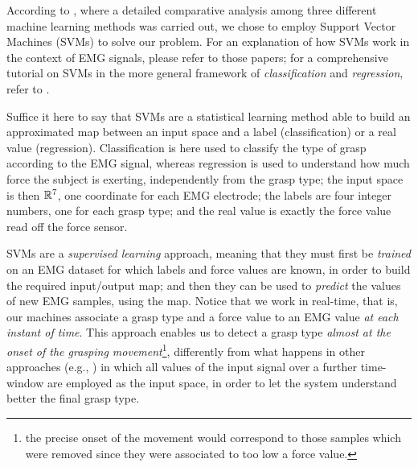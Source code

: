 According to \cite{2008.ICRA,2008.BioCyb}, where a detailed
comparative analysis among three different machine learning methods
was carried out, we chose to employ Support Vector Machines (SVMs) to
solve our problem. For an explanation of how SVMs work in the context
of EMG signals, please refer to those papers; for a comprehensive
tutorial on SVMs in the more general framework of
\emph{classification} and \emph{regression}, refer to
\cite{Burges98,SmolaTut2004}.

Suffice it here to say that SVMs are a statistical learning method
able to build an approximated map between an input space and a label
(classification) or a real value (regression). Classification is here
used to classify the type of grasp according to the EMG signal,
whereas regression is used to understand how much force the subject is
exerting, independently from the grasp type; the input space is then
$\mathbb{R}^7$, one coordinate for each EMG electrode; the labels are four
integer numbers, one for each grasp type; and the real value is
exactly the force value read off the force sensor.

SVMs are a \emph{supervised learning} approach, meaning that they must
first be \emph{trained} on an EMG dataset for which labels and force
values are known, in order to build the required input/output map; and
then they can be used to \emph{predict} the values of new EMG samples,
using the map. Notice that we work in real-time, that is, our machines
associate a grasp type and a force value to an EMG value \emph{at each
instant of time}. This approach enables us to detect a grasp type
\emph{almost at the onset of the grasping movement}\footnote{the
precise onset of the movement would correspond to those samples which
were removed since they were associated to too low a force value.},
differently from what happens in other approaches (e.g.,
\cite{smagt,Sebelius2005}) in which all values of the input signal over a
further time-window are employed as the input space, in order to let
the system understand better the final grasp type.

